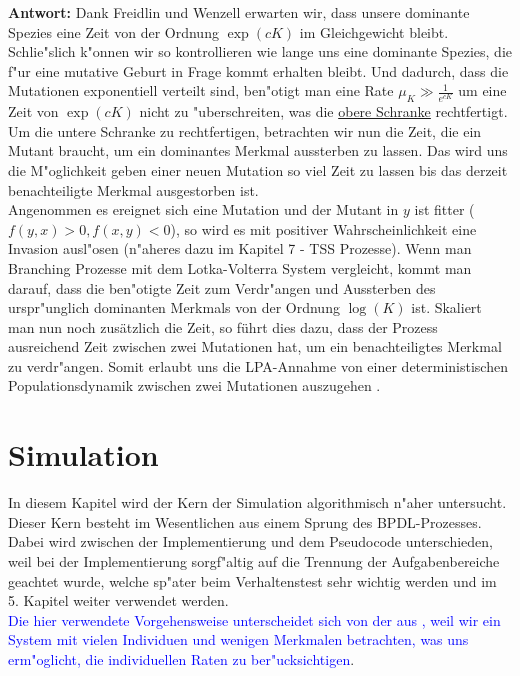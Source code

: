 \documentclass[11pt, a4paper, german]{article}
\theoremstyle{plain}
\begin{document}
	\textbf{Antwort:} Dank Freidlin und Wenzell \cite{freidlin2012random} erwarten wir, dass unsere dominante Spezies eine Zeit von der Ordnung $ \exp(cK) $ im Gleichgewicht bleibt. Schlie"slich k"onnen wir so kontrollieren wie lange uns eine dominante Spezies, die f"ur eine mutative Geburt in Frage kommt erhalten bleibt. Und dadurch, dass die Mutationen exponentiell verteilt sind, ben"otigt man eine Rate $ \mu_K \gg \frac{1}{e^{cK}} $ um eine Zeit von $ \exp(cK) $ nicht zu "uberschreiten, was die \underline{obere Schranke} rechtfertigt.\\
	Um die untere Schranke zu rechtfertigen, betrachten wir nun die Zeit, die ein Mutant braucht, um ein dominantes Merkmal aussterben zu lassen. Das wird uns die M"oglichkeit geben einer neuen Mutation so viel Zeit zu lassen bis das derzeit benachteiligte Merkmal ausgestorben ist.\\
	Angenommen es ereignet sich eine Mutation und der Mutant in $ y $ ist fitter ($ f(y,x) > 0, f(x,y) < 0 $), so wird es mit positiver Wahrscheinlichkeit eine Invasion ausl"osen (n"aheres dazu im Kapitel 7 - TSS Prozesse). Wenn man Branching Prozesse mit dem Lotka-Volterra System vergleicht, kommt man darauf, dass die ben"otigte Zeit zum Verdr"angen und Aussterben des urspr"unglich dominanten Merkmals von der Ordnung $ \log(K) $ ist.
%	
	Skaliert man nun noch zusätzlich die Zeit, so führt dies dazu, dass der Prozess ausreichend Zeit zwischen zwei Mutationen hat, um ein benachteiligtes Merkmal zu verdr"angen.
	Somit erlaubt uns die LPA-Annahme von einer deterministischen Populationsdynamik zwischen zwei Mutationen auszugehen \cite{raey}.\\
	
	
\clearpage
\section{Simulation}
In diesem Kapitel wird der Kern der Simulation algorithmisch n"aher untersucht. Dieser Kern besteht im Wesentlichen aus einem Sprung des BPDL-Prozesses.
Dabei wird zwischen der Implementierung und dem Pseudocode unterschieden, weil bei der Implementierung sorgf"altig auf die Trennung der Aufgabenbereiche geachtet wurde, welche sp"ater beim Verhaltenstest sehr wichtig werden und im 5. Kapitel weiter verwendet werden.\\
\textcolor{blue}{Die hier verwendete Vorgehensweise unterscheidet sich von der aus \cite{fournier2004microscopic}, weil wir ein System mit vielen Individuen und wenigen Merkmalen betrachten, was uns erm"oglicht, die individuellen Raten zu ber"ucksichtigen}.
\end{document}
